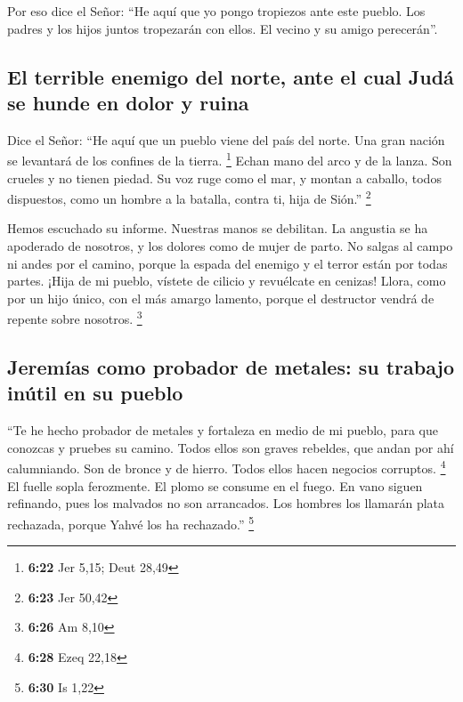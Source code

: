 \begin{paracol}{2}
 Por eso dice el Señor: ``He aquí que yo pongo tropiezos
ante este pueblo. Los padres y los hijos juntos tropezarán con ellos. El
vecino y su amigo perecerán''.

\hypertarget{el-terrible-enemigo-del-norte-ante-el-cual-juduxe1-se-hunde-en-dolor-y-ruina}{%
\subsection{El terrible enemigo del norte, ante el cual Judá se hunde en
dolor y
ruina}\label{el-terrible-enemigo-del-norte-ante-el-cual-juduxe1-se-hunde-en-dolor-y-ruina}}

 Dice el Señor: ``He aquí que un pueblo viene del país
del norte. Una gran nación se levantará de los confines de la tierra.
\footnote{\textbf{6:22} Jer 5,15; Deut 28,49}  Echan mano
del arco y de la lanza. Son crueles y no tienen piedad. Su voz ruge como
el mar, y montan a caballo, todos dispuestos, como un hombre a la
batalla, contra ti, hija de Sión.'' \footnote{\textbf{6:23} Jer 50,42}

 Hemos escuchado su informe. Nuestras manos se debilitan.
La angustia se ha apoderado de nosotros, y los dolores como de mujer de
parto.  No salgas al campo ni andes por el camino, porque
la espada del enemigo y el terror están por todas partes.
 ¡Hija de mi pueblo, vístete de cilicio y revuélcate en
cenizas! Llora, como por un hijo único, con el más amargo lamento,
porque el destructor vendrá de repente sobre nosotros. \footnote{\textbf{6:26}
  Am 8,10}

\hypertarget{jeremuxedas-como-probador-de-metales-su-trabajo-inuxfatil-en-su-pueblo}{%
\subsection{Jeremías como probador de metales: su trabajo inútil en su
pueblo}\label{jeremuxedas-como-probador-de-metales-su-trabajo-inuxfatil-en-su-pueblo}}

 ``Te he hecho probador de metales y fortaleza en medio
de mi pueblo, para que conozcas y pruebes su camino. 
Todos ellos son graves rebeldes, que andan por ahí calumniando. Son de
bronce y de hierro. Todos ellos hacen negocios corruptos. \footnote{\textbf{6:28}
  Ezeq 22,18}  El fuelle sopla ferozmente. El plomo se
consume en el fuego. En vano siguen refinando, pues los malvados no son
arrancados.  Los hombres los llamarán plata rechazada,
porque Yahvé los ha rechazado.'' \footnote{\textbf{6:30} Is 1,22}


\end{paracol}
